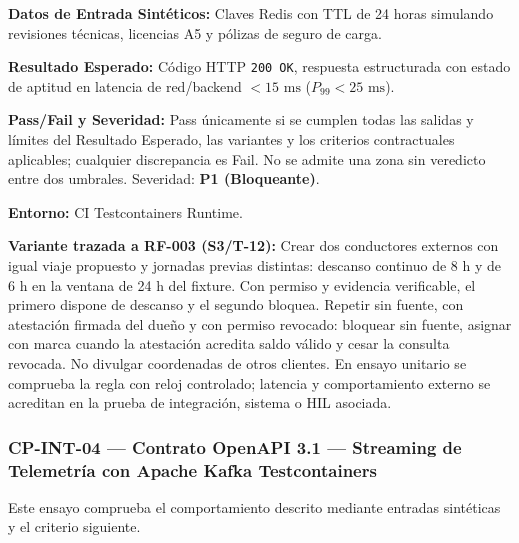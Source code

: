 \par\noindent\textbf{Datos de Entrada Sintéticos:} Claves Redis con TTL de 24 horas simulando revisiones técnicas, licencias A5 y pólizas de seguro de carga.\par
\par\noindent\textbf{Resultado Esperado:} Código HTTP \texttt{2\allowbreak{}0\allowbreak{}0\allowbreak{} O\allowbreak{}K\allowbreak{}}, respuesta estructurada con estado de aptitud en latencia de red/backend \(< 15\text{ ms}\) (\(P_{99} < 25\text{ ms}\)).\par
\par\noindent\textbf{Pass/Fail y Severidad:} Pass únicamente si se cumplen todas las salidas y límites del Resultado Esperado, las variantes y los criterios contractuales aplicables; cualquier discrepancia es Fail. No se admite una zona sin veredicto entre dos umbrales. Severidad: \textbf{P1 (Bloqueante)}.\par
\par\noindent\textbf{Entorno:} CI Testcontainers Runtime.\par







\par\noindent\textbf{Variante trazada a RF-003 (S3/T-12):} Crear dos conductores externos con igual viaje propuesto y jornadas previas distintas: descanso continuo de 8 h y de 6 h en la ventana de 24 h del fixture. Con permiso y evidencia verificable, el primero dispone de descanso y el segundo bloquea. Repetir sin fuente, con atestación firmada del dueño y con permiso revocado: bloquear sin fuente, asignar con marca cuando la atestación acredita saldo válido y cesar la consulta revocada. No divulgar coordenadas de otros clientes. En ensayo unitario se comprueba la regla con reloj controlado; latencia y comportamiento externo se acreditan en la prueba de integración, sistema o HIL asociada.\par
\subsubsection*{CP-INT-04 — Contrato OpenAPI 3.1 — Streaming de Telemetría con Apache Kafka Testcontainers}\label{sec:9-cp-int-04}
Este ensayo comprueba el comportamiento descrito mediante entradas sintéticas y el criterio siguiente.

